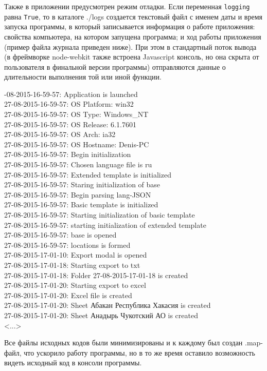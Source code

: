 Также в приложении предусмотрен режим отладки. Если переменная \texttt{logging} равна \texttt{True}, то в каталоге ./logs создается текстовый файл с именем даты и время запуска программы, в который записывается информация о работе приложения: свойства компьютера, на котором запущена программа; и ход работы приложения (пример файла журнала приведен ниже). При этом в стандартный поток вывода (в фреймворке node-webkit также встроена Javascript консоль, но она скрыта от пользователя в финальной версии программы) отправляются данные о длительности выполнения той или иной функции.

\begin{framed}
	-08-2015-16-59-57: Application is launched \\
	27-08-2015-16-59-57: OS Platform: win32 \\
	27-08-2015-16-59-57: OS Type: Windows\_NT \\
	27-08-2015-16-59-57: OS Release: 6.1.7601 \\
	27-08-2015-16-59-57: OS Arch: ia32 \\
	27-08-2015-16-59-57: OS Hostname: Denis-PC \\
	27-08-2015-16-59-57: Begin initialization \\
	27-08-2015-16-59-57: Chosen language file is ru \\
	27-08-2015-16-59-57: Extended template is initialized \\
	27-08-2015-16-59-57: Staring initialization of base \\
	27-08-2015-16-59-57: Begin parsing lang-JSON \\
	27-08-2015-16-59-57: Basic template is initialized \\
	27-08-2015-16-59-57: Starting initialization of basic template \\
	27-08-2015-16-59-57: starting initialization of extended template \\
	27-08-2015-16-59-57: base is opened \\
	27-08-2015-16-59-57: locations is formed \\
	27-08-2015-17-01-10: Export modal is opened \\
	27-08-2015-17-01-18: Starting export to txt  \\
	27-08-2015-17-01-18: Folder 27-08-2015-17-01-18 is created  \\
	27-08-2015-17-01-20: Starting export to excel  \\
	27-08-2015-17-01-20: Excel file is created  \\
	27-08-2015-17-01-20: Sheet Абакан  Республика Хакасия is created  \\
	27-08-2015-17-01-20: Sheet Анадырь  Чукотский АО is created \\
	<...>
\end{framed}

Все файлы исходных кодов были минимизированы и к каждому был создан .map-файл, что ускорило работу программы, но в то же время оставило возможность видеть исходный код в консоли программы.\cite{habr:maps}



